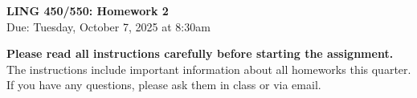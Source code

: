 \documentclass[12pt, letterpaper]{article}
\begin{document}


\begin{center}
    {\Large \textbf{LING 450/550: Homework 2}}\\
    {\large Due: Tuesday, October 7, 2025 at 8:30am}
\end{center}
\thispagestyle{fancy}



\textbf{Please read all instructions carefully before starting the assignment.} The instructions include important information about all homeworks this quarter. If you have any questions, please ask them in class or via email.
\end{document}
